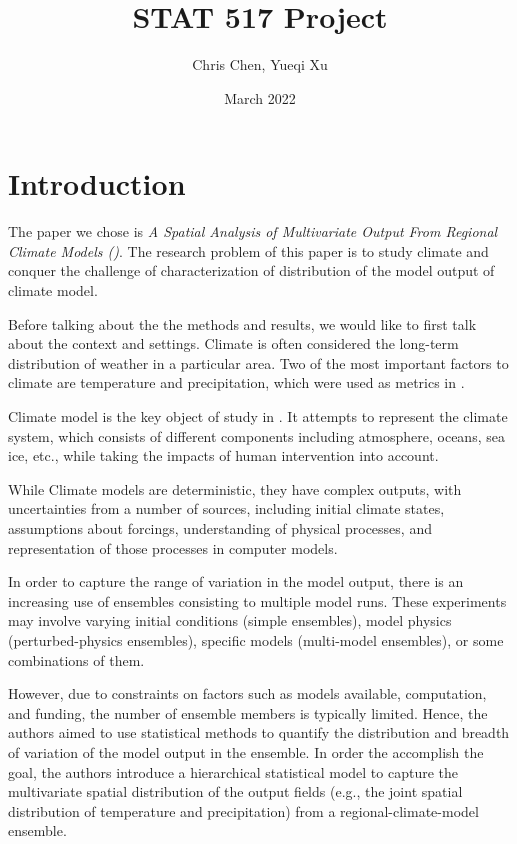 \documentclass[12pt]{amsart}
\title{STAT 517 Project}
\author{Chris Chen, Yueqi Xu}
\date{March 2022}
\begin{document}
\maketitle

\section{Introduction}
The paper we chose is \emph{A Spatial Analysis of Multivariate Output From Regional Climate Models (\cite{paper})}. The research problem of this paper is to study climate and conquer the challenge of characterization of distribution of the model output of climate model. 

Before talking about the the methods and results, we would like to first talk about the context and settings. Climate is often considered the long-term distribution of weather in a particular area. Two of the most important factors to climate are temperature and precipitation, which were used as metrics in \cite{paper}. 

Climate model is the key object of study in \cite{paper}. It attempts to represent the climate system, which consists of different components including atmosphere, oceans, sea ice, etc., while taking the impacts of human intervention into account.

While Climate models are deterministic, they have complex outputs, with uncertainties from a number of sources, including initial climate states, assumptions about forcings, understanding of physical processes, and representation of those processes in computer models.

In order to capture the range of variation in the model output, there is an increasing use of ensembles consisting to multiple model runs. These experiments may involve varying initial conditions (simple ensembles), model physics (perturbed-physics ensembles), specific models (multi-model ensembles), or some combinations of them.

However, due to constraints on factors such as models available, computation, and funding, the number of ensemble members is typically limited. Hence, the authors aimed to use statistical methods to quantify the distribution and breadth of variation of the model output in the ensemble. In order the accomplish the goal, the authors introduce a hierarchical statistical model to capture the multivariate spatial distribution of the output fields (e.g., the joint spatial distribution of temperature and precipitation) from a regional-climate-model ensemble.
\end{document}
